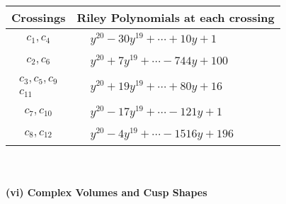 \documentclass[1p]{elsarticle_modified}
\theoremstyle{definition}
\begin{document}
\begin{tabular}{m{50pt}|m{274pt}}
Crossings & \hspace{64pt}Riley Polynomials at each crossing \\
\hline $$\begin{aligned}c_{1},c_{4}\end{aligned}$$&$\begin{aligned}
&y^{20}-30 y^{19}+\cdots+10 y+1
\end{aligned}$\\
\hline $$\begin{aligned}c_{2},c_{6}\end{aligned}$$&$\begin{aligned}
&y^{20}+7 y^{19}+\cdots-744 y+100
\end{aligned}$\\
\hline $$\begin{aligned}c_{3},c_{5},c_{9}\\c_{11}\end{aligned}$$&$\begin{aligned}
&y^{20}+19 y^{19}+\cdots+80 y+16
\end{aligned}$\\
\hline $$\begin{aligned}c_{7},c_{10}\end{aligned}$$&$\begin{aligned}
&y^{20}-17 y^{19}+\cdots-121 y+1
\end{aligned}$\\
\hline $$\begin{aligned}c_{8},c_{12}\end{aligned}$$&$\begin{aligned}
&y^{20}-4 y^{19}+\cdots-1516 y+196
\end{aligned}$\\
\hline
\end{tabular}\\~\\
\newpage\flushleft \textbf{(vi) Complex Volumes and Cusp Shapes}
\end{document}
